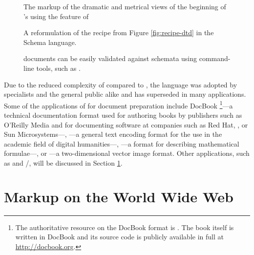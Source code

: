\documentclass{book}
\begin{document}
\begin{figure}[hb!]
  
  \caption{The markup of the dramatic and metrical views of the beginning of
    's  using the 
    feature of }
\end{figure}


\begin{figure}[H]
  \caption{A reformulation of the recipe  from Figure
    \ref{fig:recipe-dtd} in the  Schema 
    language.}
  \label{fig:recipe-xsd}
  \caption{A reformulation of the recipe  from Figure
    \ref{fig:recipe-dtd} in the compact syntax of .%
    }
  \label{fig:recipe-rnc}
  \caption{ documents can be easily validated against 
    schemata using command-line tools, such as .}
\end{figure}

Due to the reduced complexity of  compared to , the
language was adopted by specialists and the general public alike and has
superseded  in many applications. Some of the applications of
 for document preparation include DocBook%
\footnote{
  The authoritative resource on the DocBook  format is
  \textcite{walsh10}. The book itself is written in DocBook and its source code
  is publicly available in full at \url{http://docbook.org}.
}---a technical documentation format used for authoring books by publishers such
as O'Reilly Media and for documenting software at companies such as Red Hat,
, or Sun Microsystems---, ---a general text encoding
format for the use in the academic field of digital humanities---,
---a format for describing mathematical formulae---, or
---a two-dimensional vector image format. Other 
applications, such as  and /, will
be discussed in Section \ref{sec:www-markup}.
      
\section{Markup on the World Wide Web}\label{sec:www-markup}
\end{document}
